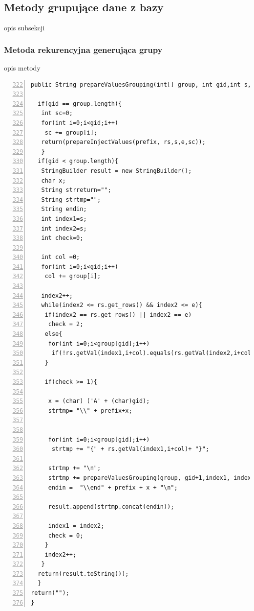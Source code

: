 \subsection{Metody grupujące dane z bazy}
opis subsekcji

\subsubsection*{Metoda rekurencyjna generująca grupy}
opis metody
 \begin{lstlisting}[numbers=left,firstnumber=322]
 public String prepareValuesGrouping(int[] group, int gid,int s, int e, RecordSet rs, String prefix){

  if(gid == group.length){
   int sc=0;
   for(int i=0;i<gid;i++)
    sc += group[i];
   return(prepareInjectValues(prefix, rs,s,e,sc));
   }
  if(gid < group.length){
   StringBuilder result = new StringBuilder(); 
   char x;
   String strreturn="";
   String strtmp="";
   String endin;
   int index1=s;
   int index2=s;
   int check=0;

   int col =0;
   for(int i=0;i<gid;i++)
    col += group[i];
          
   index2++;
   while(index2 <= rs.get_rows() && index2 <= e){
    if(index2 == rs.get_rows() || index2 == e)
     check = 2;
    else{
     for(int i=0;i<group[gid];i++)
      if(!rs.getVal(index1,i+col).equals(rs.getVal(index2,i+col)))check = 1;
    }
           
    if(check >= 1){

     x = (char) ('A' + (char)gid);
     strtmp= "\\" + prefix+x;
               
               
     for(int i=0;i<group[gid];i++)
      strtmp += "{" + rs.getVal(index1,i+col)+ "}";
               
     strtmp += "\n"; 
     strtmp += prepareValuesGrouping(group, gid+1,index1, index2, rs, prefix);
     endin =  "\\end" + prefix + x + "\n";

     result.append(strtmp.concat(endin));

     index1 = index2;
     check = 0;
    }
    index2++;
   }
  return(result.toString());    
  }
return("");
}
\end{lstlisting}


